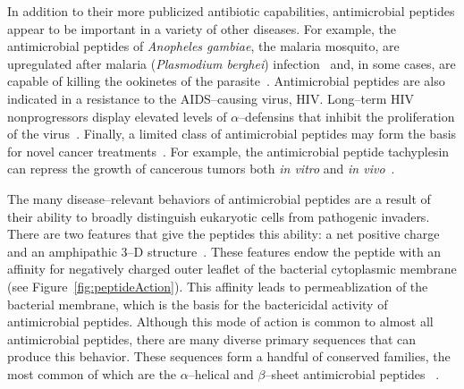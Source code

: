     In addition to their more publicized
    antibiotic capabilities, antimicrobial peptides
    appear to be important in a variety of other
    diseases.  For example, the antimicrobial
    peptides of \emph{Anopheles gambiae},
    the malaria mosquito, are upregulated
    after malaria (\emph{Plasmodium berghei})
    infection~\cite{christophides2002immunity}
    and, in some cases, are capable
    of killing the ookinetes of the
    parasite~\cite{barillas2000mosquito,vizioli2001gambicin}.
    Antimicrobial peptides are also indicated in a
    resistance to the AIDS--causing virus, HIV\@.
    Long--term HIV nonprogressors display
    elevated levels of $\alpha$--defensins
    that inhibit the proliferation of the
    virus~\cite{zhang2002contribution}.
    Finally, a limited class of antimicrobial
    peptides may form the basis for novel cancer
    treatments~\cite{kim2003invitro,ellerby1999anticancer}.
    For example, the antimicrobial peptide
    tachyplesin can repress the growth of cancerous
    tumors both \emph{in vitro} and \emph{in
    vivo}~\cite{chen2001rgdtachyplesin}.

    The many disease--relevant behaviors of
    antimicrobial peptides are a result of their
    ability to broadly distinguish eukaryotic
    cells from pathogenic invaders.  There are two
    features that give the peptides this ability:
    a net positive charge and an amphipathic 3--D
    structure~\cite{giangaspero2001amphipathic,epand1999diversity}.
    These features endow the peptide with an
    affinity for negatively charged outer leaflet
    of the bacterial cytoplasmic membrane (see
    Figure~\vref{fig:peptideAction}).  This affinity
    leads to permeablization of the bacterial membrane,
    which is the basis for the bactericidal activity
    of antimicrobial peptides.  Although this mode
    of action is common to almost all antimicrobial
    peptides, there are many diverse primary sequences
    that can produce this behavior.  These sequences
    form a handful of conserved families, the most
    common of which are the $\alpha$--helical
    and $\beta$--sheet antimicrobial peptides
    ~\cite{tossi2000amphipathic}.

